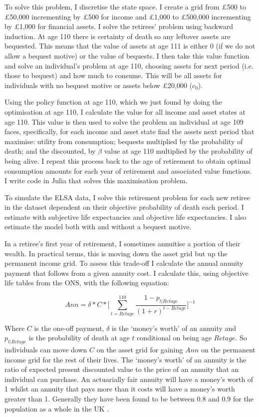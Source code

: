 \documentclass[12pt]{article}
\begin{document}
To solve this problem, I discretise the state space. I create a grid from £500
to £50,000 incrementing by £500 for income and £1,000 to £500,000 incrementing
by £1,000 for financial assets. I solve the retirees' problem using backward
induction. At age 110 there is certainty of death so any leftover assets are
bequested. This means that the value of assets at age 111 is either 0 (if we do
not allow a bequest motive) or the value of bequests. I then take this value
function and solve an individual's problem at age 110, choosing assets for next
period (i.e. those to bequest) and how much to consume. This will be all assets
for individuals with no bequest motive or assets below £20,000 ($c_{0}$).

Using the policy function at age 110, which we just found by doing the
optimisation at age 110, I calculate the value for all income and asset states
at age 110. This value is then used to solve the problem an individual at age
109 faces, specifically, for each income and asset state find the assets next
period that maximise: utility from consumption; bequests multiplied by the
probability of death; and the discounted, by $\beta$ value at age 110 multiplied
by the probability of being alive. I repeat this process back to the age of
retirement to obtain optimal consumption amounts for each year of retirement and
associated value functions. I write code in Julia that solves this maximisation
problem.

To simulate the ELSA data, I solve this retirement problem for each new retiree
in the dataset dependent on their objective probability of death each period. I
estimate with subjective life expectancies and objective life expectancies. I
also estimate the model both with and without a bequest motive.


In a retiree's first year of retirement, I sometimes annuitise a portion of
their wealth. In practical terms, this is moving down the asset grid but up the
permanent income grid. To assess this trade-off I calculate the annual annuity
payment that follows from a given annuity cost. I calculate this, using
objective life tables from the ONS, with the following equation:

\begin{equation*}
    Ann = \delta * C * \biggl[\sum_{t = Retage}^{110}\frac{1 - p_{t|Retage}}{(1 + r)^{t - Retage}}\biggr]^{-1}
\end{equation*}

Where $C$ is the one-off payment, $\delta$ is the `money's worth' of an annuity
and $p_{t|Retage}$ is the probability of death at age $t$ conditional on being
age $Retage$. So individuals can move down $C$ on the asset grid for gaining
$Ann$ on the permanent income grid for the rest of their lives. The `money's
worth' of an annuity is the ratio of expected present discounted value to the
price of an annuity that an individual can purchase. An actuarially fair annuity
will have a money's worth of 1 whilst an annuity that pays more than it costs
will have a money's worth greater than 1. Generally they have been found to be
between $0.8$ and $0.9$ for the population as a whole in the UK
\citep{finkelstein_porteba_2002, finkelstein_porteba_2004, mitchell_et_al_1999}.
\end{document}
